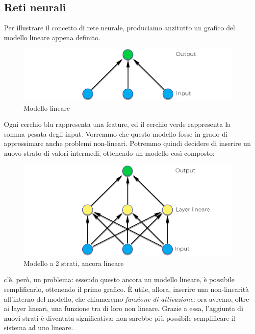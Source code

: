 \subsection{Reti neurali}
Per illustrare il concetto di rete neurale, produciamo anzitutto un grafico del modello lineare appena definito.
\begin{figure}[H]
    \begin{center}
        \includegraphics[width=0.8\columnwidth]{images/stateofart/linear-NN.png}
    \end{center}
    \caption{Modello lineare}
    \label{fig:linear-NN}
\end{figure}
Ogni cerchio blu rappresenta una feature, ed il cerchio verde rappresenta la somma pesata degli input. Vorremmo che questo modello fosse in grado di approssimare anche problemi non-lineari. Potremmo quindi decidere di inserire un nuovo strato di valori intermedi, ottenendo un modello così composto:
\begin{figure}[H]
    \begin{center}
        \includegraphics[width=0.8\columnwidth]{images/stateofart/double-linear-NN.png}
    \end{center}
    \caption{Modello a 2 strati, ancora lineare}
    \label{fig:double-linear-NN}
\end{figure}
c'è, però, un problema: essendo questo ancora un modello lineare, è possibile semplificarlo, ottenendo il primo grafico. È utile, allora, inserire una non-linearità all'interno del modello, che chiameremo \textit{funzione di attivazione}: ora avremo, oltre ai layer lineari, una funzione tra di loro non lineare. Grazie a essa, l'aggiunta di nuovi strati è diventata significativa: non sarebbe più possibile semplificare il sistema ad uno lineare.

